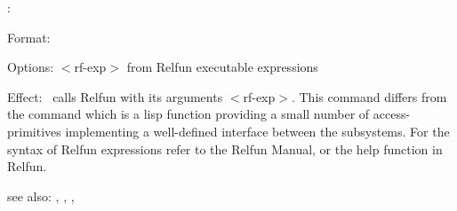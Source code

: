 \colab{} \rf:

Format: 

Options: $<$rf-exp$>$ from Relfun executable expressions

Effect: \rf \ calls Relfun with its arguments $<$rf-exp$>$.
        This command differs from the command 
        which is a lisp function providing a small number of 
        access-primitives implementing a well-defined interface 
        between the \COLAB{} subsystems. For the syntax of Relfun 
        expressions refer to the Relfun Manual, or the help function 
        in Relfun.

see also: \col, \fw, \cn, \tx
